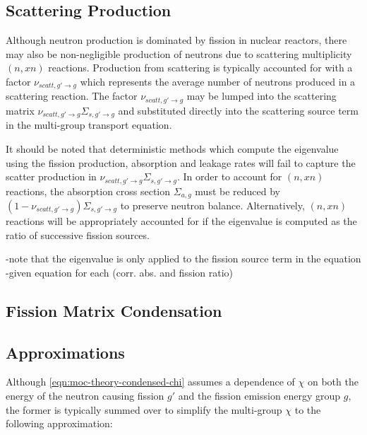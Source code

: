 \subsection{Scattering Production}
\label{sec:chap2-scatt-prod}

Although neutron production is dominated by fission in nuclear reactors, there may also be non-negligible production of neutrons due to scattering multiplicity $(n,xn)$ reactions. Production from scattering is typically accounted for with a factor $\nu_{scatt,g' \rightarrow g}$ which represents the average number of neutrons produced in a scattering reaction. The factor $\nu_{scatt,g' \rightarrow g}$ may be lumped into the scattering matrix $\nu_{scatt,g' \rightarrow g}\Sigma_{s,g' \rightarrow g}$ and substituted directly into the scattering source term in the multi-group transport equation. 

It should be noted that deterministic methods which compute the eigenvalue using the fission production, absorption and leakage rates will fail to capture the scatter production in $\nu_{scatt,g' \rightarrow g}\Sigma_{s,g' \rightarrow g}$.
In order to account for $(n,xn)$ reactions, the absorption cross section $\Sigma_{a,g}$ must be reduced by $(1-\nu_{scatt,g' \rightarrow g})\Sigma_{s,g' \rightarrow g}$ to preserve neutron balance. Alternatively, $(n,xn)$ reactions will be appropriately accounted for if the eigenvalue is computed as the ratio of successive fission sources.

-note that the eigenvalue is only applied to the fission source term in the equation\\
-given equation for each (corr. abs. and fission ratio)\\


\subsection{Fission Matrix Condensation}
\label{sec:chap2-fiss-mat}


\subsection{Approximations}
\label{subsec:chap2-approx}

Although \autoref{eqn:moc-theory-condensed-chi} assumes a dependence of $\chi$ on both the energy of the neutron causing fission $g'$ and the fission emission energy group $g$, the former is typically summed over to simplify the multi-group $\chi$ to the following approximation:


